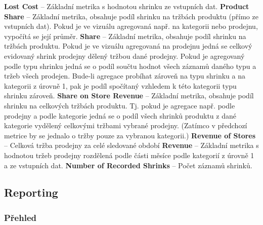 \textbf{Lost Cost} -- Základní metrika s hodnotou shrinku ze vstupních dat.
\textbf{Product Share} -- Základní metrika, obsahuje podíl shrinku na tržbách produktu (přímo ze vstupních dat). Pokud je ve vizuálu agregovaná např. na kategorii nebo prodejnu, vypočítá se její průměr.
\textbf{Share} -- Základní metrika, obsahuje podíl shrinku na tržbách produktu. Pokud je ve vizuálu agregovaná na prodejnu jedná se celkový evidovaný shrink prodejny dělený tržbou dané prodejny. Pokud je agregovaný podle typu shrinku jedná se o podíl součtu hodnot všech záznamů daného typu a tržeb všech prodejen. Bude-li agregace probíhat zároveň na typu shrinku a na kategorii z úrovně 1, pak je podíl spočítaný vzhledem k této kategorii typu shrinku zároveň. 
\textbf{Share on Store Revenue} -- Základní metrika, obsahuje podíl shrinku na celkových tržbách produktu. Tj. pokud je agregace např. podle prodejny a podle kategorie jedná se o podíl všech shrinků produktu z dané kategorie vydělený celkovými tržbami vybrané prodejny. (Zatímco v předchozí metrice by se jednalo o tržby pouze za vybranou kategorii.)
\textbf{Revenue of Stores} -- Celková tržba prodejny za celé sledované období
\textbf{Revenue} -- Základní metrika s hodnotou tržeb prodejny rozdělená podle části měsíce podle kategorií z úrovně 1 a  ze vstupních dat.
\textbf{Number of Recorded Shrinks} -- Počet záznamů shrinků.

\subsection{Reporting}

\subsubsection*{Přehled}

